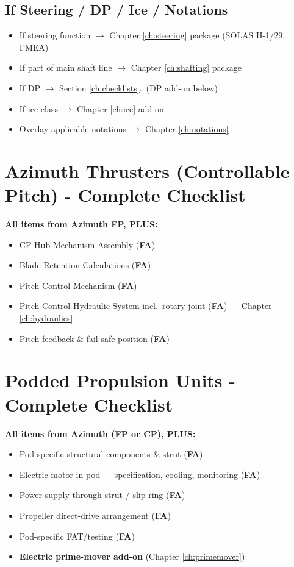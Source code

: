 \documentclass[11pt,a4paper]{report}
\newcommand{\fa}{\textbf{\textcolor{warningred}{FA}}}
\begin{document}
\subsection{If Steering / DP / Ice / Notations}
\begin{itemize}[label=$\square$]
\item If steering function $\rightarrow$ Chapter \ref{ch:steering} package (SOLAS II-1/29, FMEA)
\item If part of main shaft line $\rightarrow$ Chapter \ref{ch:shafting} package
\item If DP $\rightarrow$ Section \ref{ch:checklists}.\ (DP add-on below)
\item If ice class $\rightarrow$ Chapter \ref{ch:ice} add-on
\item Overlay applicable notations $\rightarrow$ Chapter \ref{ch:notations}
\end{itemize}

\section{Azimuth Thrusters (Controllable Pitch) - Complete Checklist}

\textbf{All items from Azimuth FP, PLUS:}
\begin{itemize}[label=$\square$]
\item CP Hub Mechanism Assembly (\fa{})
\item Blade Retention Calculations (\fa{})
\item Pitch Control Mechanism (\fa{})
\item Pitch Control Hydraulic System incl.\ rotary joint (\fa{}) --- Chapter \ref{ch:hydraulics}
\item Pitch feedback \& fail-safe position (\fa{})
\end{itemize}

\section{Podded Propulsion Units - Complete Checklist}

\textbf{All items from Azimuth (FP or CP), PLUS:}
\begin{itemize}[label=$\square$]
\item Pod-specific structural components \& strut (\fa{})
\item Electric motor in pod --- specification, cooling, monitoring (\fa{})
\item Power supply through strut / slip-ring (\fa{})
\item Propeller direct-drive arrangement (\fa{})
\item Pod-specific FAT/testing (\fa{})
\item \textbf{Electric prime-mover add-on} (Chapter \ref{ch:primemover})
\end{itemize}
\end{document}
